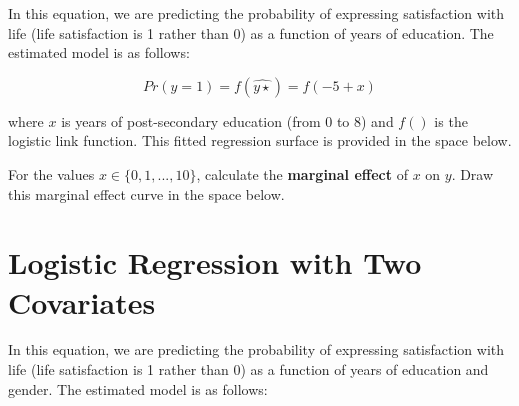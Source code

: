 \documentclass[a4paper,12pt]{article}
\begin{document}
In this equation, we are predicting the probability of expressing satisfaction with life (life satisfaction is 1 rather than 0) as a function of years of education. The estimated model is as follows:

\begin{equation}
Pr(y = 1) = f(\hat{y\star}) = f(-5 + x)
\end{equation}

\noindent where $x$ is years of post-secondary education (from 0 to 8) and $f()$ is the logistic link function. This fitted regression surface is provided in the space below. 

\begin{center}
\end{center}

\noindent For the values $x \in \{0,1,...,10\}$, calculate the \textbf{marginal effect} of $x$ on $y$. Draw this marginal effect curve in the space below.

\begin{center}
\end{center}


\section{Logistic Regression with Two Covariates}

In this equation, we are predicting the probability of expressing satisfaction with life (life satisfaction is 1 rather than 0) as a function of years of education and gender. The estimated model is as follows:
\end{document}
